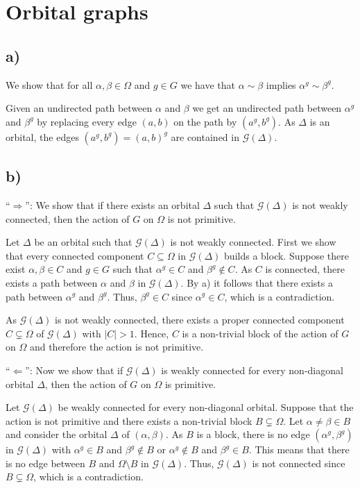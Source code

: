 \section{Orbital graphs}
\subsection*{a)}
We show that for all $\alpha, \beta \in \Omega$ and $g \in G$ we have that $\alpha \sim \beta$ implies $\alpha^g \sim \beta^g$.

Given an undirected path between $\alpha$ and $\beta$ we get an undirected path between $\alpha^g$ and $\beta^g$ by replacing every edge $(a,b)$ on the path by $(a^g,b^g)$. As $\Delta$ is an orbital, the edges $(a^g,b^g) = (a,b)^g$ are contained in $\mathcal{G}(\Delta)$.

\subsection*{b)}
``$\Rightarrow$'': We show that if there exists an orbital $\Delta$ such that $\mathcal{G}(\Delta)$ is not weakly connected, then the action of $G$ on $\Omega$ is not primitive.

Let $\Delta$ be an orbital such that $\mathcal{G}(\Delta)$ is not weakly connected. First we show that every connected component $C \subseteq \Omega$ in $\mathcal{G}(\Delta)$ builds a block. Suppose there exist $\alpha, \beta \in C$ and $g \in G$ such that $\alpha^g \in C$ and $\beta^g \notin C$. As $C$ is connected, there exists a path between $\alpha$ and $\beta$ in $\mathcal{G}(\Delta)$. By a) it follows that there exists a path between $\alpha^g$ and $\beta^g$. Thus, $\beta^g \in C$ since $\alpha^g \in C$, which is a contradiction.

As $\mathcal{G}(\Delta)$ is not weakly connected, there exists a proper connected component $C \subsetneq \Omega$ of $\mathcal{G}(\Delta)$ with $|C| > 1$. Hence, $C$ is a non-trivial block of the action of $G$ on $\Omega$ and therefore the action is not primitive.

``$\Leftarrow$'': Now we show that if $\mathcal{G}(\Delta)$ is weakly connected for every non-diagonal orbital $\Delta$, then the action of $G$ on $\Omega$ is primitive.

Let $\mathcal{G}(\Delta)$ be weakly connected for every non-diagonal orbital. Suppose that the action is not primitive and there exists a non-trivial block $B \subsetneq \Omega$. Let $\alpha \neq \beta \in B$ and consider the orbital $\Delta$ of $(\alpha,\beta)$. As $B$ is a block, there is no edge $(\alpha^g,\beta^g)$ in $\mathcal{G}(\Delta)$ with $\alpha^g \in B$ and $\beta^g \notin B$ or $\alpha^g \notin B$ and $\beta^g \in B$. This means that there is no edge between $B$ and $\Omega \setminus B$ in $\mathcal{G}(\Delta)$. Thus, $\mathcal{G}(\Delta)$ is not connected since $B \subsetneq \Omega$, which is a contradiction.